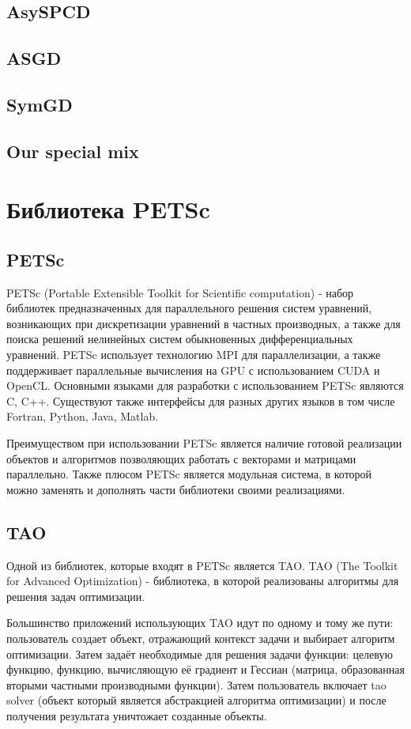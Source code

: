 \documentclass[12pt]{report}
\begin{document}
  \section{AsySPCD}
  \section{ASGD}
  \section{SymGD}
  \section{Our special mix}

  \chapter{Библиотека PETSc}
  \section{PETSc}
  PETSc (Portable Extensible Toolkit for Scientific computation) - набор
  библиотек предназначенных для параллельного решения систем уравнений,
  возникающих при дискретизации уравнений в частных производных, а также для
  поиска решений нелинейных систем обыкновенных дифференциальных уравнений.
  PETSc использует технологию MPI для параллелизации, а также поддерживает
  параллельные вычисления на GPU с использованием CUDA и OpenCL. Основными
  языками для разработки с использованием PETSc являются C, C++.
  Существуют также интерфейсы для разных других языков в том числе Fortran,
  Python, Java, Matlab.

  Преимуществом при использовании PETSc является наличие готовой реализации
  объектов и алгоритмов позволяющих работать с векторами и матрицами параллельно.
  Также плюсом PETSc является модульная система, в которой можно заменять и
  дополнять части библиотеки своими реализациями.

  \section{TAO}
  Одной из библиотек, которые входят в PETSc является TAO. TAO (The Toolkit for
  Advanced Optimization) - библиотека, в которой реализованы алгоритмы для
  решения задач оптимизации.

  Большинство приложений использующих TAO идут по одному и тому же пути: пользователь
  создает объект, отражающий контекст задачи и выбирает алгоритм оптимизации.
  Затем задаёт необходимые для решения задачи функции: целевую функцию, функцию,
  вычисляющую её градиент и Гессиан (матрица, образованная вторыми частными
  производными функции). Затем пользователь включает tao solver (объект который
  является абстракцией алгоритма оптимизации) и после получения результата уничтожает
  созданные объекты.
\end{document}
